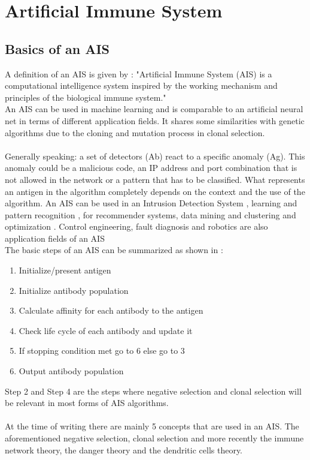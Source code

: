 \chapter{Artificial Immune System}
\label{chap:ais}
\section{Basics of an AIS}
A definition of an AIS is given by \cite[p. 5]{tan2016artificial}:
"Artificial Immune System (AIS) is a computational intelligence system inspired by the working mechanism and principles of the biological immune system."\\An AIS can be used in machine learning and is comparable to an artificial neural net in terms of different application fields.
It shares some similarities with genetic algorithms due to the cloning and mutation process in clonal selection.\\\\
Generally speaking: a set of detectors (Ab) react to a specific anomaly (Ag). This anomaly could be a malicious code, an IP address and port combination that is not allowed in the network or a pattern that has to be classified. What represents an antigen in the algorithm completely depends on the context and the use of the algorithm. An AIS can be used in an Intrusion Detection System \cite{PAM17}, learning and pattern recognition \cite{DEC02}, for recommender systems, data mining and clustering \cite{burke2013} and optimization \cite{NAN08}. Control engineering, fault diagnosis and robotics are also application fields of an AIS \cite{tan2016artificial}\\

The basic steps of an AIS can be summarized as shown in \cite{tan2016artificial}:
\begin{enumerate}
	\item 	Initialize/present antigen
	\item 	Initialize antibody population
	\item 	Calculate affinity for each antibody to the antigen
	\item 	Check life cycle of each antibody and update it
	\item 	If stopping condition met go to 6 else go to 3
	\item 	Output antibody population
\end{enumerate}
Step 2 and Step 4 are the steps where negative selection and clonal selection will be relevant in most forms of AIS algorithms.\\\\
At the time of writing there are mainly 5 concepts that are used in an AIS. The aforementioned negative selection, clonal selection and more recently the immune network theory, the danger theory and the dendritic cells theory. 

